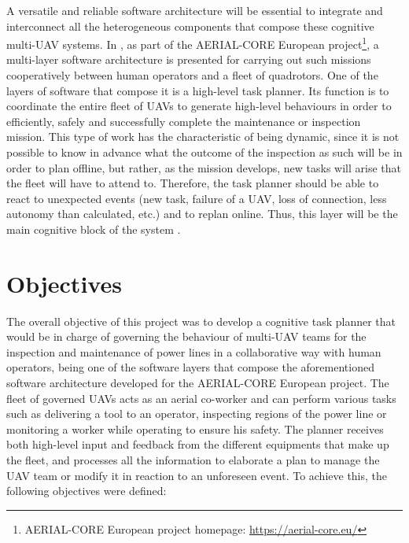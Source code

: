 A versatile and reliable software architecture will be essential to integrate and interconnect all the heterogeneous components that compose these cognitive multi-\gls{UAV} systems. In \cite{AerialCoreMulti-Layer}, as part of the AERIAL-CORE European project\footnote{AERIAL-CORE European project homepage: \url{https://aerial-core.eu/}}, a multi-layer software architecture is presented for carrying out such missions cooperatively between human operators and a fleet of quadrotors. One of the layers of software that compose it is a high-level task planner. Its function is to coordinate the entire fleet of \glspl{UAV} to generate high-level behaviours in order to efficiently, safely and successfully complete the maintenance or inspection mission. This type of work has the characteristic of being dynamic, since it is not possible to know in advance what the outcome of the inspection as such will be in order to plan offline, but rather, as the mission develops, new tasks will arise that the fleet will have to attend to. Therefore, the task planner should be able to react to unexpected events (new task, failure of a \gls{UAV}, loss of connection, less autonomy than calculated, etc.) and to replan online. Thus, this layer will be the main cognitive block of the system \cite{AerialCoreMulti-Layer}.

\section{Objectives}
\label{sec:Objectives}
The overall objective of this project was to develop a cognitive task planner that would be in charge of governing the behaviour of multi-\gls{UAV} teams for the inspection and maintenance of power lines in a collaborative way with human operators, being one of the software layers that compose the aforementioned software architecture \cite{AerialCoreMulti-Layer} developed for the AERIAL-CORE European project. The fleet of governed \glspl{UAV} acts as an aerial co-worker and can perform various tasks such as delivering a tool to an operator, inspecting regions of the power line or monitoring a worker while operating to ensure his safety. The planner receives both high-level input and feedback from the different equipments that make up the fleet, and processes all the information to elaborate a plan to manage the \gls{UAV} team or modify it in reaction to an unforeseen event. To achieve this, the following objectives were defined:

